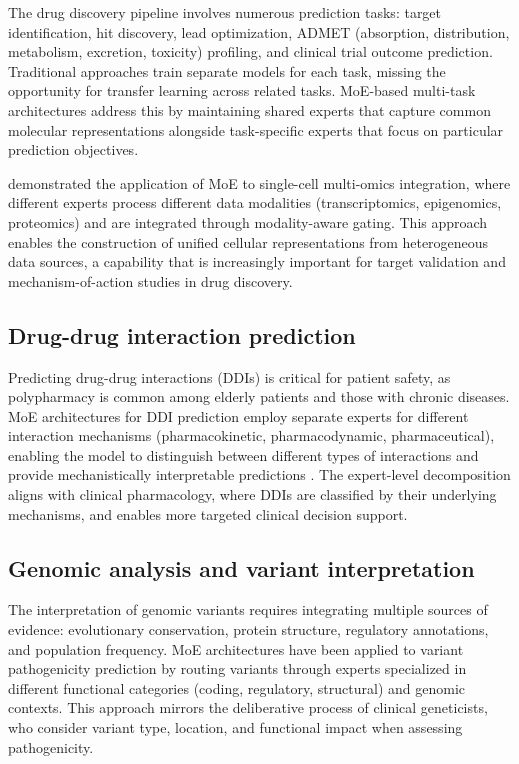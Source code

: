The drug discovery pipeline involves numerous prediction tasks: target identification, hit discovery, lead optimization, ADMET (absorption, distribution, metabolism, excretion, toxicity) profiling, and clinical trial outcome prediction. Traditional approaches train separate models for each task, missing the opportunity for transfer learning across related tasks. MoE-based multi-task architectures address this by maintaining shared experts that capture common molecular representations alongside task-specific experts that focus on particular prediction objectives.

\cite{ma2024moe_single_cell} demonstrated the application of MoE to single-cell multi-omics integration, where different experts process different data modalities (transcriptomics, epigenomics, proteomics) and are integrated through modality-aware gating. This approach enables the construction of unified cellular representations from heterogeneous data sources, a capability that is increasingly important for target validation and mechanism-of-action studies in drug discovery.

\subsection*{Drug-drug interaction prediction}

Predicting drug-drug interactions (DDIs) is critical for patient safety, as polypharmacy is common among elderly patients and those with chronic diseases. MoE architectures for DDI prediction employ separate experts for different interaction mechanisms (pharmacokinetic, pharmacodynamic, pharmaceutical), enabling the model to distinguish between different types of interactions and provide mechanistically interpretable predictions \cite{wei2024moe_drug_combination}. The expert-level decomposition aligns with clinical pharmacology, where DDIs are classified by their underlying mechanisms, and enables more targeted clinical decision support.

\subsection*{Genomic analysis and variant interpretation}

The interpretation of genomic variants requires integrating multiple sources of evidence: evolutionary conservation, protein structure, regulatory annotations, and population frequency. MoE architectures have been applied to variant pathogenicity prediction by routing variants through experts specialized in different functional categories (coding, regulatory, structural) and genomic contexts. This approach mirrors the deliberative process of clinical geneticists, who consider variant type, location, and functional impact when assessing pathogenicity.

